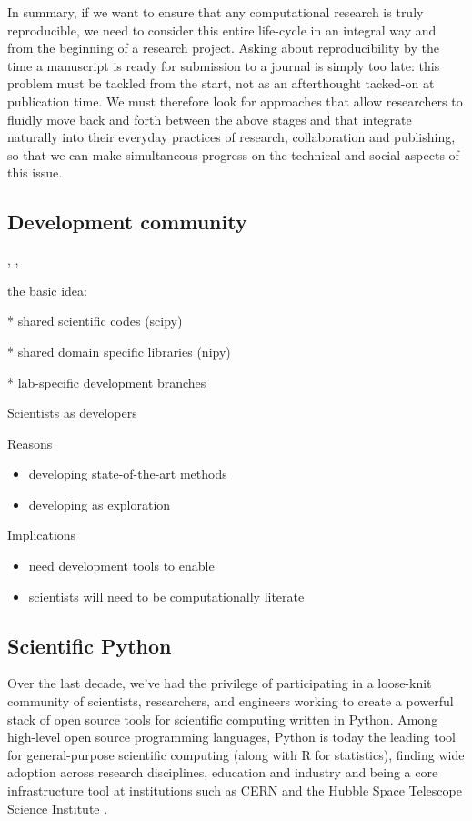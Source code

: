 \documentclass[ChapterTOCs,krantz2]{krantz} %
\theoremstyle{definition}
\begin{document}
In summary, if we want to ensure that any computational research is truly
reproducible, we need to consider this entire life-cycle in an integral way and
from the beginning of a research project.  Asking about reproducibility by the
time a manuscript is ready for submission to a journal is simply too late: this
problem must be tackled from the start, not as an afterthought tacked-on at
publication time.  We must therefore look for approaches that allow researchers
to fluidly move back and forth between the above stages and that integrate
naturally into their everyday practices of research, collaboration and
publishing, so that we can make simultaneous progress on the technical and
social aspects of this issue.

\subsection{\label{sec:research}Development community}
\cite{turk2013scale}, \cite{joyner2007open}, \cite{prlic2012ten}

the basic idea:

* shared scientific codes (scipy)

* shared domain specific libraries (nipy)

* lab-specific development branches

Scientists as developers

Reasons

\begin{itemize}
\item  developing state-of-the-art methods
\item developing as exploration
\end{itemize}

Implications

\begin{itemize}
\item need development tools to enable
\item scientists will need to be computationally literate
\end{itemize}

\subsection{Scientific Python}

Over the last decade, we've had the privilege of participating in a loose-knit
community of scientists, researchers, and engineers working to create a powerful
stack of open source tools for scientific computing written in Python.  Among
high-level open source programming languages, Python is today the leading tool
for general-purpose scientific computing (along with R for statistics),
finding wide adoption across research disciplines, education and industry and
being a core infrastructure tool at institutions such as CERN and the Hubble
Space Telescope Science Institute
\cite{millman2011python,Perez2011,ganga09,SST}.
\end{document}
